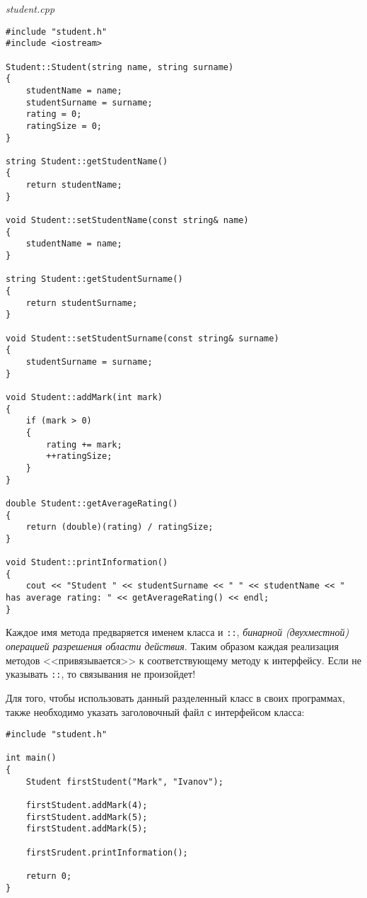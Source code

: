 \emph{student.cpp}
\begin{lstlisting}
#include "student.h"
#include <iostream>

Student::Student(string name, string surname)
{
    studentName = name;
    studentSurname = surname;
    rating = 0;
    ratingSize = 0;
}

string Student::getStudentName()
{
    return studentName;
}

void Student::setStudentName(const string& name)
{
    studentName = name;
}

string Student::getStudentSurname()
{
    return studentSurname;    
}

void Student::setStudentSurname(const string& surname)
{
    studentSurname = surname;
}

void Student::addMark(int mark)
{
    if (mark > 0)
    {
        rating += mark;
        ++ratingSize;    
    }
}

double Student::getAverageRating()
{
    return (double)(rating) / ratingSize;
}

void Student::printInformation()
{
    cout << "Student " << studentSurname << " " << studentName << " has average rating: " << getAverageRating() << endl; 
}
\end{lstlisting}

Каждое имя метода предваряется именем класса и \lstinline|::|, \emph{бинарной (двухместной) операцией разрешения области действия}. Таким образом каждая реализация методов <<привязывается>> к соответствующему методу к интерфейсу. Если не указывать \lstinline|::|, то связывания не произойдет! 

Для того, чтобы использовать данный разделенный класс в своих программах, также необходимо указать заголовочный файл с интерфейсом класса:

\begin{lstlisting}
#include "student.h"

int main()
{
    Student firstStudent("Mark", "Ivanov");
    
    firstStudent.addMark(4);
    firstStudent.addMark(5);
    firstStudent.addMark(5);
    
    firstSrudent.printInformation();
    
    return 0;
}
\end{lstlisting}